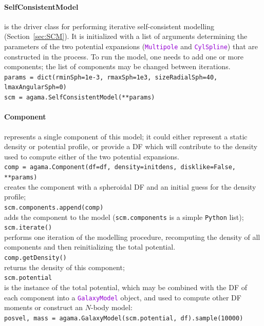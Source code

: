 \documentclass[12pt]{article}
\newcommand{\Python}{\texttt{Python}\xspace}
\newcommand{\ttt}[1]{\textcolor{darkviolet}{\texttt{#1}}}
\begin{document}
\paragraph{SelfConsistentModel} is the driver class for performing iterative self-consistent modelling (Section~\ref{sec:SCM}). It is initialized with a list of arguments determining the parameters of the two potential expansions (\ttt{Multipole} and \ttt{CylSpline}) that are constructed in the process. To run the model, one needs to add one or more components; the list of components may be changed between iterations.\\
\texttt{params = dict(rminSph=1e-3, rmaxSph=1e3, sizeRadialSph=40, lmaxAngularSph=0)}\\
\texttt{scm = agama.SelfConsistentModel(**params)}

\paragraph{Component} represents a single component of this model; it could either represent a static density or potential profile, or provide a DF which will contribute to the density used to compute either of the two potential expansions.\\[2mm]
\texttt{comp = agama.Component(df=df, density=initdens, disklike=False, **params)}\\
creates the component with a spheroidal DF and an initial guess for the density profile;\\[2mm]
\texttt{scm.components.append(comp)}\\
adds the component to the model (\texttt{scm.components} is a simple \Python list);\\[2mm]
\texttt{scm.iterate()}\\
performs one iteration of the modelling procedure, recomputing the density of all components and then reinitializing the total potential.\\[2mm]
\texttt{comp.getDensity()}\\
returns the density of this component; \\[2mm]
\texttt{scm.potential}\\ is the instance of the total potential, which may be combined with the DF of each component into a \ttt{GalaxyModel} object, and used to compute other DF moments or construct an $N$-body model:\\
\texttt{posvel, mass = agama.GalaxyModel(scm.potential, df).sample(10000)}
\end{document}
